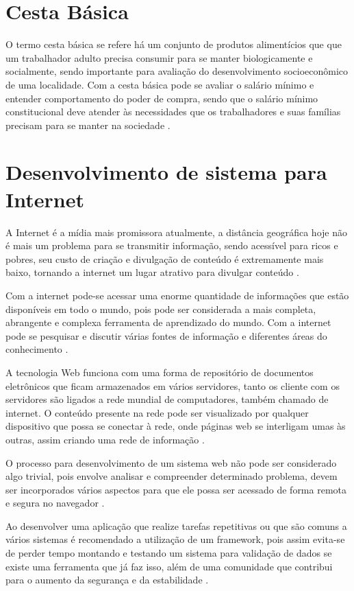\documentclass{ifto-tex}
\begin{document}
	\section{Cesta Básica}
	O termo cesta básica se refere há um conjunto de produtos alimentícios que que um trabalhador adulto precisa consumir para se manter biologicamente e socialmente, sendo importante para avaliação do desenvolvimento socioeconômico de uma localidade. Com a cesta básica pode se avaliar o salário mínimo e entender comportamento do poder de compra, sendo que o salário mínimo constitucional deve atender às necessidades que os trabalhadores e suas famílias precisam para se manter na sociedade \cite{araujo2007impacto}.
	
	\section{Desenvolvimento de sistema para Internet}
A Internet é a mídia mais promissora atualmente, a distância geográfica hoje não é mais um problema para se transmitir informação, sendo acessível para ricos e pobres, seu custo de criação e divulgação de conteúdo é extremamente mais baixo, tornando a internet um lugar atrativo para divulgar conteúdo \cite{moran1997utilizar}.

Com a internet pode-se acessar uma enorme quantidade de informações que estão disponíveis em todo o mundo, pois pode ser considerada a mais completa, abrangente e complexa ferramenta de aprendizado do mundo. Com a internet pode se pesquisar e discutir várias fontes de informação e diferentes áreas do conhecimento \cite{garcia2002internet}.

A tecnologia Web funciona com uma forma de repositório de documentos eletrônicos que ficam armazenados em vários servidores, tanto os cliente com os servidores são ligados a rede mundial de computadores, também chamado de internet. O conteúdo presente na rede pode ser visualizado por qualquer dispositivo que possa se conectar à rede, onde páginas web se interligam umas às outras, assim criando uma rede de informação \cite{junior2009sistemas}.

O processo para desenvolvimento de um sistema web não pode ser considerado algo trivial, pois envolve analisar e compreender determinado problema, devem ser incorporados vários aspectos para que ele possa ser acessado de forma remota e segura no navegador \cite{miletto2014desenvolvimento}.

Ao desenvolver uma aplicação que realize tarefas repetitivas ou que são comuns a vários sistemas é recomendado a utilização de um framework, pois assim evita-se de perder tempo montando e testando um sistema para validação de dados se existe uma ferramenta que já faz isso, além de uma comunidade que contribui para o aumento da segurança e da estabilidade \cite{OqueeumF24:online}.
\end{document}

